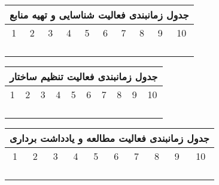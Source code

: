 \documentclass{report}
\begin{document}
\newpage

\begin{center}
\begin{tabular}{ |c|c|c|c|c|c|c|c|c|c|}
\hline
\multicolumn{10}{|c|}{جدول زمانبندی فعالیت شناسایی و تهیه منابع } \\
\hline
1&2&3&4&5&6&7&8&9&10\\
\hline
\cellcolor{black!100} & \cellcolor{black!100} & &  & &  &  & &  & \\
\hline
\cellcolor{black!100} & \cellcolor{black!100} & \cellcolor{black!100} & &  &  & &  & & \\
\hline
\cellcolor{black!100} & \cellcolor{black!100}& \cellcolor{black!100} &  & &  & & & & \\
\hline
\cellcolor{black!100} & \cellcolor{black!100} & \cellcolor{black!100} &  & &  & & & &  \\
\hline
\end{tabular}
\end{center}

\begin{center}
\begin{tabular}{ |c|c|c|c|c|c|c|c|c|c|}
\hline
\multicolumn{10}{|c|}{جدول زمانبندی فعالیت تنظیم ساختار } \\
\hline
1&2&3&4&5&6&7&8&9&10\\
\hline
 &  & & \cellcolor{black!100} & &  &  & &  & \\
\hline
 &  & & \cellcolor{black!100} & \cellcolor{black!100} &  & &  & & \\
\hline
 & &  & \cellcolor{black!100} & \cellcolor{black!100} & \cellcolor{black!100} & & & & \\
\hline
 &  & \cellcolor{black!100} & \cellcolor{black!100} & \cellcolor{black!100} & \cellcolor{black!100} & & & &  \\
\hline
\end{tabular}
\end{center}

\begin{center}
\begin{tabular}{ |c|c|c|c|c|c|c|c|c|c|}
\hline
\multicolumn{10}{|c|}{جدول زمانبندی فعالیت مطالعه و یادداشت برداری } \\
\hline
1&2&3&4&5&6&7&8&9&10\\
\hline
 &  & &  & & \cellcolor{black!100} &  & &  & \\
\hline
 &  & &  & \cellcolor{black!100} & \cellcolor{black!100}  &  &  & & \\
\hline
 & &  & \cellcolor{black!100} & \cellcolor{black!100} & \cellcolor{black!100} & \cellcolor{black!100} & & & \\
\hline
 &  &  & \cellcolor{black!100} & \cellcolor{black!100} & \cellcolor{black!100} & \cellcolor{black!100} & & &  \\
\hline
\end{tabular}
\end{center}
\end{document}
